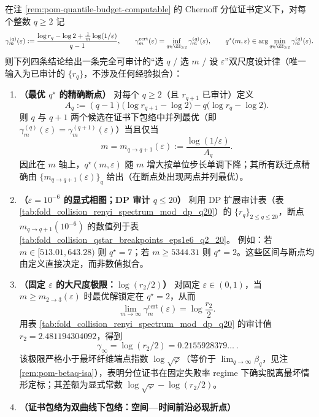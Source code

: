 \begin{remark}\label{rem:pom-qstar-phase-diagram-breakpoints}
在注 \ref{rem:pom-quantile-budget-computable} 的 Chernoff 分位证书定义下，对每个整数 \(q\ge 2\) 记
\[
\gamma^{(q)}_m(\varepsilon)
:=
\frac{\log r_q-\log 2+\frac{1}{m}\log(1/\varepsilon)}{q-1},
\qquad
\gamma^{\mathrm{cert}}_m(\varepsilon)=\inf_{q\in\ZZ_{\ge 2}}\gamma^{(q)}_m(\varepsilon),
\qquad
q^\star(m,\varepsilon)\in\arg\min_{q\in\ZZ_{\ge 2}}\gamma^{(q)}_m(\varepsilon).
\]
则下列四条结论给出一条完全可审计的“选 \(q\) / 选 \(m\) / 设 \(\varepsilon\)”双尺度设计律（唯一输入为已审计的 \(\{r_q\}\)，不涉及任何经验拟合）：
\begin{enumerate}
  \item \textbf{（最优 \(q^\star\) 的精确断点）}
  对每个 \(q\ge 2\)（且 \(r_{q+1}\) 已审计）定义
  \[
  A_q
  :=
  (q-1)\bigl(\log r_{q+1}-\log 2\bigr)-q\bigl(\log r_q-\log 2\bigr).
  \]
  则 \(q\) 与 \(q+1\) 两个候选在证书下包络中并列最优（即 \(\gamma^{(q)}_m(\varepsilon)=\gamma^{(q+1)}_m(\varepsilon)\)）当且仅当
  \[
  m=m_{q\to q+1}(\varepsilon):=\frac{\log(1/\varepsilon)}{A_q}.
  \]
  因此在 \(m\) 轴上，\(q^\star(m,\varepsilon)\) 随 \(m\) 增大按单位步长单调下降；其所有跃迁点精确由 \(\{m_{q\to q+1}(\varepsilon)\}_q\) 给出（在断点处出现两点并列最优）。
  \item \textbf{（\(\varepsilon=10^{-6}\) 的显式相图；DP 审计 \(q\le 20\)）}
  利用 DP 扩展审计表（表 \ref{tab:fold_collision_renyi_spectrum_mod_dp_q20}）的 \(\{r_q\}_{2\le q\le 20}\)，断点 \(m_{q\to q+1}(10^{-6})\) 的数值列于表 \ref{tab:fold_collision_qstar_breakpoints_eps1e6_q2_20}。
  例如：若 \(m\in[513.01,643.28)\) 则 \(q^\star=7\)；若 \(m\ge 5344.31\) 则 \(q^\star=2\)。这些区间与断点均由定义直接决定，而非数值拟合。
  \item \textbf{（固定 \(\varepsilon\) 的大尺度极限：\texorpdfstring{$\log(r_2/2)$}{log(r2/2)}）}
  对固定 \(\varepsilon\in(0,1)\)，当 \(m\ge m_{2\to 3}(\varepsilon)\) 时最优解锁定在 \(q^\star=2\)，从而
  \[
  \lim_{m\to\infty}\gamma^{\mathrm{cert}}_m(\varepsilon)=\log\frac{r_2}{2}.
  \]
  用表 \ref{tab:fold_collision_renyi_spectrum_mod_dp_q20} 的审计值 \(r_2=2.481194304092\)，得到
  \[
  \boxed{\ \gamma_\infty=\log(r_2/2)=0.2155928379\ldots\ }.
  \]
  该极限严格小于最坏纤维端点指数 \(\log\sqrt{\varphi}\)（等价于 \(\lim_{q\to\infty}\beta_q\)，见注 \ref{rem:pom-betaq-isa}），表明分位证书在固定失败率 regime 下确实脱离最坏情形定标；其差额为显式常数 \(\log\sqrt{\varphi}-\log(r_2/2)\)。
  \item \textbf{（证书包络为双曲线下包络：空间—时间前沿必现折点）}

\end{enumerate}
\end{remark}

